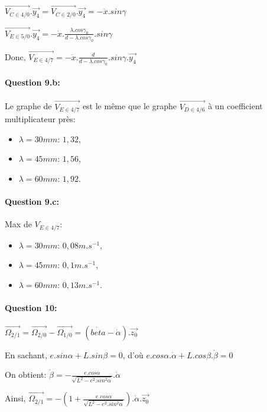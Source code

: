 $\overrightarrow{V_{C\in 4/0}}.\overrightarrow{y_4}=\overrightarrow{V_{C\in 2/0}}.\overrightarrow{y_4}=-\dot{x}.sin\gamma$

$\overrightarrow{V_{E\in 5/0}}.\overrightarrow{y_4}=-\dot{x}.\frac{\lambda.cos\gamma_0}{d-\lambda.cos\gamma_0}.sin\gamma$

Donc, $\overrightarrow{V_{E\in 4/7}}=-\dot{x}.\frac{d}{d-\lambda.cos\gamma_0}.sin\gamma.\overrightarrow{y_4}$

\paragraph{Question 9.b:}

Le graphe de $\overrightarrow{V_{E\in 4/7}}$ est le même que le graphe $\overrightarrow{V_{D\in 4/6}}$ à un coefficient multiplicateur près:
\begin{itemize}
 \item $\lambda=30mm$: $1,32$,
 \item $\lambda=45mm$: $1,56$,
 \item $\lambda=60mm$: $1,92$.
\end{itemize}

\paragraph{Question 9.c:}

Max de $V_{E\in4/7}$:
\begin{itemize}
 \item $\lambda=30mm$: $0,08m.s^{-1}$,
 \item $\lambda=45mm$: $0,1m.s^{-1}$,
 \item $\lambda=60mm$: $0,13m.s^{-1}$.
\end{itemize}
\paragraph{Question 10:}

$\overrightarrow{\Omega_{2/1}}=\overrightarrow{\Omega_{2/0}}-\overrightarrow{\Omega_{1/0}}=(\dot{beta}-\dot{\alpha}).\overrightarrow{z_0}$

En sachant, $e.sin\alpha+L.sin\beta=0$, d'où $e.cos\alpha.\dot{\alpha}+L.cos\beta.\dot{\beta}=0$

On obtient: $\dot{\beta}=-\frac{e.cos\alpha}{\sqrt{L^2-e^2.sin^2\alpha}}.\dot{\alpha}$

Ainsi, $\overrightarrow{\Omega_{2/1}}=-\left(1+\frac{e.cos\alpha}{\sqrt{L^2-e^2.sin^2\alpha}}\right).\dot{\alpha}.\overrightarrow{z_0}$


